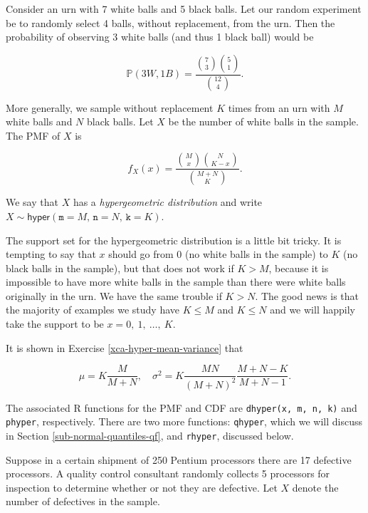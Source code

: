 \documentclass[]{book}
\numberwithin{equation}{chapter}
\numberwithin{figure}{chapter}
\theoremstyle{plain}
\theoremstyle{definition}
\theoremstyle{remark}
\theoremstyle{definition}
\theoremstyle{definition}
\theoremstyle{remark}
\let\BeginKnitrBlock\begin \let\EndKnitrBlock\end
\begin{document}
Consider an urn with 7 white balls and 5 black balls. Let our random
experiment be to randomly select 4 balls, without replacement, from the
urn. Then the probability of observing 3 white balls (and thus 1 black
ball) would be

\begin{equation}
\mathbb{P}(3W,1B)=\frac{{7 \choose 3}{5 \choose 1}}{{12 \choose 4}}.
\end{equation}

More generally, we sample without replacement \(K\) times from an urn
with \(M\) white balls and \(N\) black balls. Let \(X\) be the number of
white balls in the sample. The PMF of \(X\) is

\begin{equation}
f_{X}(x)=\frac{{M \choose x}{N \choose K-x}}{{M+N \choose K}}.
\end{equation}

We say that \(X\) has a \emph{hypergeometric distribution} and write
\(X\sim\mathsf{hyper}(\mathtt{m}=M,\,\mathtt{n}=N,\,\mathtt{k}=K)\).

The support set for the hypergeometric distribution is a little bit
tricky. It is tempting to say that \(x\) should go from 0 (no white
balls in the sample) to \(K\) (no black balls in the sample), but that
does not work if \(K>M\), because it is impossible to have more white
balls in the sample than there were white balls originally in the urn.
We have the same trouble if \(K>N\). The good news is that the majority
of examples we study have \(K\leq M\) and \(K\leq N\) and we will
happily take the support to be \(x=0,\ 1,\ \ldots,\ K\).

It is shown in Exercise \ref{xca-hyper-mean-variance} that

\begin{equation}
\mu=K\frac{M}{M+N},\quad \sigma^{2}=K\frac{MN}{(M+N)^{2}}\frac{M+N-K}{M+N-1}.
\end{equation}

The associated R functions for the PMF and CDF are
\texttt{dhyper(x,\ m,\ n,\ k)} and \texttt{phyper}, respectively. There
are two more functions: \texttt{qhyper}, which we will discuss in
Section \ref{sub-normal-quantiles-qf}, and \texttt{rhyper}, discussed
below.

\bigskip

\BeginKnitrBlock{example}
\protect\hypertarget{ex:unnamed-chunk-227}{}{\label{ex:unnamed-chunk-227}}Suppose
in a certain shipment of 250 Pentium processors there are 17 defective
processors. A quality control consultant randomly collects 5 processors
for inspection to determine whether or not they are defective. Let \(X\)
denote the number of defectives in the sample.
\EndKnitrBlock{example}
\end{document}
